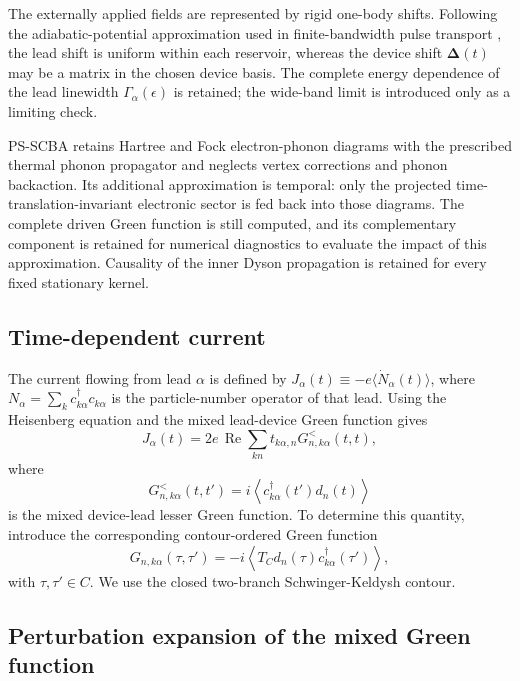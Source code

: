 \documentclass[
 reprint,
 superscriptaddress,
 amsmath,amssymb,
 aps,prb,
 longbibliography,
 floatfix
]{revtex4-2}
\begin{document}
The externally applied fields are represented by rigid one-body shifts. Following the adiabatic-potential approximation used in finite-bandwidth pulse transport \cite{JauhoWingreenMeir1994,MaciejkoWangGuo2006}, the lead shift is uniform within each reservoir, whereas the device shift \(\bm\Delta(t)\) may be a matrix in the chosen device basis. The complete energy dependence of the lead linewidth \(\Gamma_\alpha(\epsilon)\) is retained; the wide-band limit is introduced only as a limiting check.

PS-SCBA retains Hartree and Fock electron-phonon diagrams with the prescribed thermal phonon propagator and neglects vertex corrections and phonon backaction. Its additional approximation is temporal: only the projected time-translation-invariant electronic sector is fed back into those diagrams. The complete driven Green function is still computed, and its complementary component is retained for numerical diagnostics to evaluate the impact of this approximation. Causality of the inner Dyson propagation is retained for every fixed stationary kernel.


\subsection{Time-dependent current}
\label{sec:time-current}
The current flowing from lead $\alpha$ is defined by $J_\alpha(t)\equiv-e\langle\dot N_\alpha(t)\rangle$, where $N_\alpha=\sum_k c_{k\alpha}^{\dagger}c_{k\alpha}$ is the particle-number operator of that lead. Using the Heisenberg equation and the mixed lead-device Green function gives
\begin{equation}
J_\alpha(t)
=
2e\,\operatorname{Re}
\sum_{kn}
t_{k\alpha,n}
G_{n,k\alpha}^{<}(t,t),
\label{eq:mixed-current}
\end{equation}
where
\begin{equation*}
G_{n,k\alpha}^{<}(t,t')
=
i\left\langle
c_{k\alpha}^{\dagger}(t')d_n(t)
\right\rangle
\end{equation*}
is the mixed device-lead lesser Green function. To determine this quantity, introduce the corresponding contour-ordered Green function
\begin{equation*}
G_{n,k\alpha}(\tau,\tau')
=
-i
\left\langle
T_C
d_n(\tau)c_{k\alpha}^{\dagger}(\tau')
\right\rangle,
\end{equation*}
with \(\tau,\tau'\in C\). We use the closed two-branch Schwinger-Keldysh contour.

\subsection{Perturbation expansion of the mixed Green function}
\label{subsec:mixed-expansion}
\end{document}
